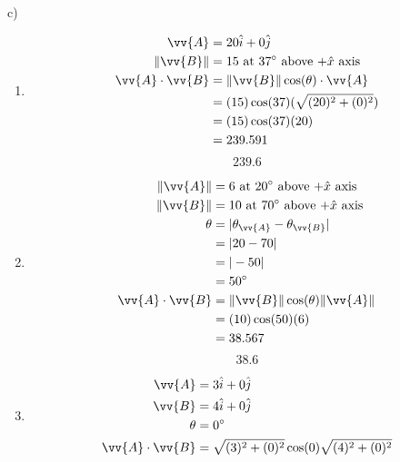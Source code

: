 \documentclass{article}
\begin{document}
c)
\begin{enumerate}[label=\arabic*)]
    \item
        \begin{align*}
            \vv{A} & = 20\hat{i} + 0\hat{j} \\
            \|\vv{B}\| & = 15 \text{ at $ 37\degree $ above $ +\hat{x} $ axis} \\
            \vv{A} \cdot \vv{B} & = \|\vv{B}\|\cos(\theta) \cdot \vv{A} \\
                                & = (15)\cos(37)(\sqrt{(20)^2+(0)^2}) \\
                                & = (15)\cos(37)(20) \\
                                & = 239.591
        \end{align*}
        \begin{equation*}
            \boxed{239.6}
        \end{equation*}
    \item
        \begin{align*}
            \|\vv{A}\| & = 6 \text{ at $ 20\degree $ above $ +\hat{x} $ axis} \\
            \|\vv{B}\| & = 10 \text{ at $ 70\degree $ above $ +\hat{x} $ axis} \\
            \theta & = |\theta_{\vv{A}} - \theta_{\vv{B}}| \\
                   & = |20 - 70| \\
                   & = |-50| \\
                   & = 50\degree \\
            \vv{A} \cdot \vv{B} & = \|\vv{B}\|\cos(\theta)\|\vv{A}\| \\
                                & = (10)\cos(50)(6) \\
                                & = 38.567
        \end{align*}
        \begin{equation*}
            \boxed{38.6}
        \end{equation*}
    \item
        \begin{align*}
            \vv{A} & = 3\hat{i} + 0\hat{j} \\
            \vv{B} & = 4\hat{i} + 0\hat{j} \\
            \theta & = 0\degree \\
            \vv{A} \cdot \vv{B} & = \sqrt{(3)^2 + (0)^2}\cos(0)\sqrt{(4)^2 + (0)^2} \\

\end{align*}
\end{enumerate}
\end{document}

